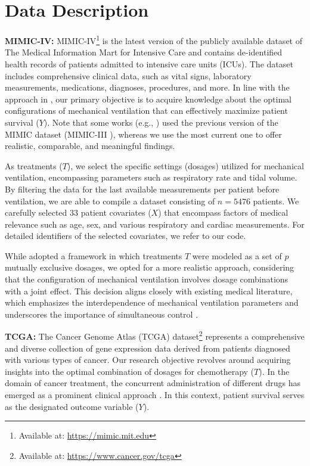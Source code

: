 \clearpage



\section{Data Description} \label{sec:appendix_data}
\textbf{MIMIC-IV:} MIMIC-IV\footnote{Available at: \url{https://mimic.mit.edu}} is the latest version of the publicly available dataset of The Medical Information Mart for Intensive Care \cite{Johnson.2023} and contains de-identified health records of patients admitted to intensive care units (ICUs). The dataset includes comprehensive clinical data, such as vital signs, laboratory measurements, medications, diagnoses, procedures, and more. In line with the approach in \cite{Schwab.2020}, our primary objective is to acquire knowledge about the optimal configurations of mechanical ventilation that can effectively maximize patient survival ($Y$). Note that some works (e.g., \cite{Bica.2020c, Schwab.2020}) used the previous version of the MIMIC dataset (MIMIC-III \cite{Johnson.2016}), whereas we use the most current one to offer realistic, comparable, and meaningful findings. 

As treatments ($T$), we select the specific settings (dosages) utilized for mechanical ventilation, encompassing parameters such as respiratory rate and tidal volume. By filtering the data for the last available measurements per patient before ventilation, we are able to compile a dataset consisting of $n=5476$ patients. We carefully selected 33 patient covariates ($X$) that encompass factors of medical relevance such as age, sex, and various respiratory and cardiac measurements. For detailed identifiers of the selected covariates, we refer to our code.

While \cite{Schwab.2020} adopted a framework in which treatments $T$ were modeled as a set of $p$ mutually exclusive dosages, we opted for a more realistic approach, considering that the configuration of mechanical ventilation involves dosage combinations with a joint effect. This decision aligns closely with existing medical literature, which emphasizes the interdependence of mechanical ventilation parameters and underscores the importance of simultaneous control \cite{Grasselli.2021}.

\textbf{TCGA:} 
The Cancer Genome Atlas (TCGA) dataset\footnote{Available at: \url{https://www.cancer.gov/tcga}} \cite{Weinstein.2013} represents a comprehensive and diverse collection of gene expression data derived from patients diagnosed with various types of cancer. Our research objective revolves around acquiring insights into the optimal combination of dosages for chemotherapy ($T$). In the domain of cancer treatment, the concurrent administration of different drugs has emerged as a prominent clinical approach \cite{Wu.2020b}. In this context, patient survival serves as the designated outcome variable ($Y$).

